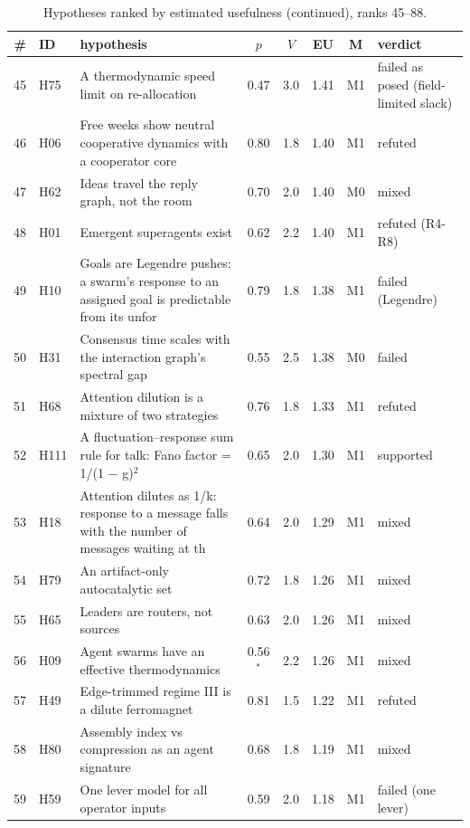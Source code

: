 \begin{table}[p]
\caption{Hypotheses ranked by estimated usefulness (continued), ranks 45--88.}

\scriptsize\renewcommand{\arraystretch}{0.95}
\begin{tabular}{@{}r l p{} c c c c l@{}}
\toprule \# & ID & hypothesis & $p$ & $V$ & EU & M & verdict\\ \midrule
45 & H75 & A thermodynamic speed limit on re-allocation & 0.47 & 3.0 & 1.41 & M1 & failed as posed (field-limited slack)\\
46 & H06 & Free weeks show neutral cooperative dynamics with a cooperator core & 0.80 & 1.8 & 1.40 & M1 & refuted\\
47 & H62 & Ideas travel the reply graph, not the room & 0.70 & 2.0 & 1.40 & M0 & mixed\\
48 & H01 & Emergent superagents exist & 0.62 & 2.2 & 1.40 & M1 & refuted (R4-R8)\\
49 & H10 & Goals are Legendre pushes: a swarm's response to an assigned goal is predictable from its unfor & 0.79 & 1.8 & 1.38 & M1 & failed (Legendre)\\
50 & H31 & Consensus time scales with the interaction graph's spectral gap & 0.55 & 2.5 & 1.38 & M0 & failed\\
51 & H68 & Attention dilution is a mixture of two strategies & 0.76 & 1.8 & 1.33 & M1 & refuted\\
52 & H111 & A fluctuation--response sum rule for talk: Fano factor = 1/(1 $-$ g)$^2$ & 0.65 & 2.0 & 1.30 & M1 & supported\\
53 & H18 & Attention dilutes as 1/k: response to a message falls with the number of messages waiting at th & 0.64 & 2.0 & 1.29 & M1 & mixed\\
54 & H79 & An artifact-only autocatalytic set & 0.72 & 1.8 & 1.26 & M1 & mixed\\
55 & H65 & Leaders are routers, not sources & 0.63 & 2.0 & 1.26 & M1 & mixed\\
56 & H09 & Agent swarms have an effective thermodynamics & 0.56$^\ast$ & 2.2 & 1.26 & M1 & mixed\\
57 & H49 & Edge-trimmed regime III is a dilute ferromagnet & 0.81 & 1.5 & 1.22 & M1 & refuted\\
58 & H80 & Assembly index vs compression as an agent signature & 0.68 & 1.8 & 1.19 & M1 & mixed\\
59 & H59 & One lever model for all operator inputs & 0.59 & 2.0 & 1.18 & M1 & failed (one lever)\\

\end{tabular}
\end{table}
